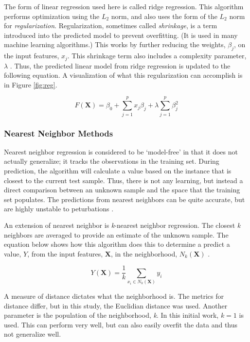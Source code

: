 The form of linear regression used here is called ridge regression. This
algorithm performs optimization using the $L_2$ norm, and also uses the form of
the $L_2$ norm for \textit{regularization}. Regularization, sometimes called
\textit{shrinkage}, is a term introduced into the predicted model to prevent
overfitting. (It is used in many machine learning algorithms.) This works by
further reducing the weights, $\beta_j$, on the input features, $x_j$. This
shrinkage term also includes a complexity parameter, $\lambda$
\cite{elements_stats}.  Thus, the predicted linear model from ridge regression
is updated to the following equation.  A visualization of what this
regularization can accomplish is in Figure \ref{fig:reg}.

\begin{equation}
  F(\boldsymbol{X}) = \beta_{0} +  \sum_{j=1}^{p} x_{j} \beta_{j} + \lambda \sum_{j=1}^{p} \beta_{j}^2
\end{equation}

\subsubsection{Nearest Neighbor Methods}
\label{sec:neighbor}

Nearest neighbor regression is considered to be `model-free' in that it does
not actually generalize; it tracks the observations in the training set.
During prediction, the algorithm will calculate a value based on the instance
that is closest to the current test sample. Thus, there is not any learning,
but instead a direct comparison between an unknown sample and the space that
the training set populates. The predictions from nearest neighbors can be quite
accurate, but are highly unstable to peturbations \cite{elements_stats}.  

An extension of nearest neighbor is \textit{k}-nearest neighbor regression.
The closest \textit{k} neighbors are averaged to provide an estimate of the
unknown sample. The equation below shows how this algorithm does this to
determine a predict a value, $Y$, from the input features, $\boldsymbol{X}$, in
the neighborhood, $N_k (\boldsymbol{X})$ \cite{elements_stats}.  

\begin{equation}
  Y(\boldsymbol{X}) = \frac{1}{k} \sum_{x_i \in N_k(\boldsymbol{X})} y_i
\end{equation}

A measure of distance dictates what the neighborhood is. The metrics for
distance differ, but in this study, the Euclidian distance was used. Another
parameter is the population of the neighborhood, \textit{k}. In this initial
work, $k = 1$ is used. This can perform very well, but can also easily overfit
the data and thus not generalize well. 

